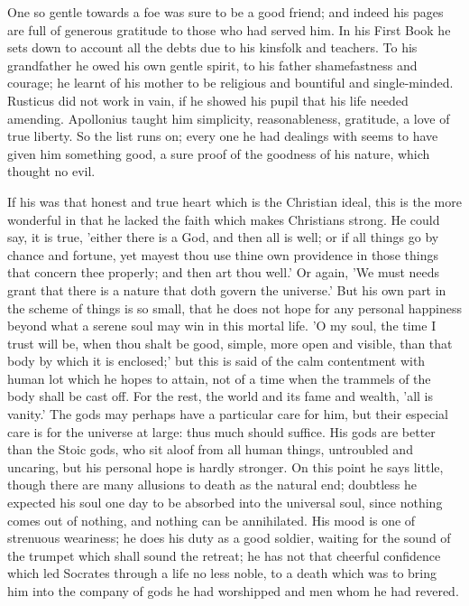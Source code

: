 One so gentle towards a foe was sure to be a good friend; and indeed his pages
are full of generous gratitude to those who had served him. In his First Book
he sets down to account all the debts due to his kinsfolk and teachers. To his
grandfather he owed his own gentle spirit, to his father shamefastness and
courage; he learnt of his mother to be religious and bountiful and
single-minded. Rusticus did not work in vain, if he showed his pupil that his
life needed amending. Apollonius taught him simplicity, reasonableness,
gratitude, a love of true liberty. So the list runs on; every one he had
dealings with seems to have given him something good, a sure proof of the
goodness of his nature, which thought no evil.

If his was that honest and true heart which is the Christian ideal, this is the
more wonderful in that he lacked the faith which makes Christians strong. He
could say, it is true, 'either there is a God, and then all is well; or if all
things go by chance and fortune, yet mayest thou use thine own providence in
those things that concern thee properly; and then art thou well.' Or again, 'We
must needs grant that there is a nature that doth govern the universe.' But his
own part in the scheme of things is so small, that he does not hope for any
personal happiness beyond what a serene soul may win in this mortal life. 'O my
soul, the time I trust will be, when thou shalt be good, simple, more open and
visible, than that body by which it is enclosed;' but this is said of the calm
contentment with human lot which he hopes to attain, not of a time when the
trammels of the body shall be cast off. For the rest, the world and its fame
and wealth, 'all is vanity.' The gods may perhaps have a particular care for
him, but their especial care is for the universe at large: thus much should
suffice. His gods are better than the Stoic gods, who sit aloof from all human
things, untroubled and uncaring, but his personal hope is hardly stronger. On
this point he says little, though there are many allusions to death as the
natural end; doubtless he expected his soul one day to be absorbed into the
universal soul, since nothing comes out of nothing, and nothing can be
annihilated. His mood is one of strenuous weariness; he does his duty as a good
soldier, waiting for the sound of the trumpet which shall sound the retreat; he
has not that cheerful confidence which led Socrates through a life no less
noble, to a death which was to bring him into the company of gods he had
worshipped and men whom he had revered.

